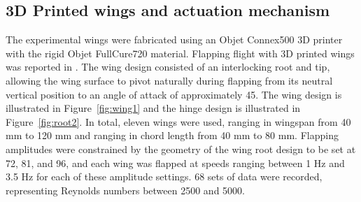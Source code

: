 \documentclass{article}
\begin{document}
\subsection*{3D Printed wings and actuation mechanism}
The experimental wings were fabricated using an Objet Connex500 3D printer with
the rigid Objet FullCure720 material.
Flapping flight with 3D printed wings was reported in \cite{richter2011untethered}. The
wing design consisted of an interlocking root and tip, allowing the wing
surface to pivot naturally during flapping from its neutral vertical position
to an angle of attack of approximately 45\textdegree. The wing design is illustrated in
Figure~\ref{fig:wing1} and the hinge design is
illustrated in Figure~\ref{fig:root2}.  In total, eleven wings were used,
ranging in wingspan from 40 mm to 120 mm and ranging in chord length from 40 mm
to 80 mm. Flapping amplitudes were constrained by the geometry of the wing root
design to be set at 72\textdegree, 81\textdegree, and 96\textdegree, and each
wing was flapped at speeds ranging between 1 Hz and 3.5 Hz for each of these
amplitude settings.  68 sets of data were recorded, representing Reynolds
numbers between 2500 and 5000.
\end{document}

